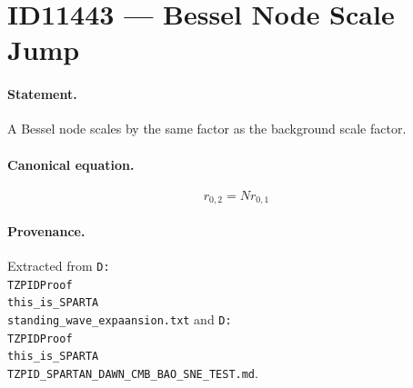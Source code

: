 \section*{ID11443 --- Bessel Node Scale Jump}

\paragraph{Statement.}
A Bessel node scales by the same factor as the background scale factor.

\paragraph{Canonical equation.}
\[
r_{0,2}=N r_{0,1}
\]

\paragraph{Provenance.}
Extracted from \texttt{D:\\TZPIDProof\\this\_is\_SPARTA\\standing\_wave\_expaansion.txt} and \texttt{D:\\TZPIDProof\\this\_is\_SPARTA\\TZPID\_SPARTAN\_DAWN\_CMB\_BAO\_SNE\_TEST.md}.
